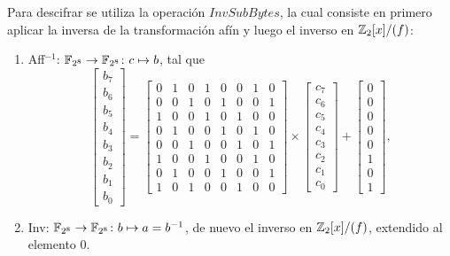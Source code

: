 \medskip
Para descifrar se utiliza la operación $InvSubBytes$, la cual consiste en primero aplicar la inversa de la transformación afín y luego el inverso en $\mathbb{Z}_2[x]/(f)$:
\vspace{-0.3em}
\begin{enumerate}[label={--}]
    \item Aff$^{-1}$: $\mathbb{F}_{2^8} \to \mathbb{F}_{2^8} \colon c \mapsto b$, tal que
    \vspace{-0.5em}
        \[
            \begin{bmatrix} 
            b_7 \\ b_6 \\ b_5 \\ b_4 \\ b_3 \\ b_2 \\ b_1 \\ b_0 
            \end{bmatrix} 
        = 
            \begin{bmatrix} 
            0 & 1 & 0 & 1 & 0 & 0 & 1 & 0 \\ 
            0 & 0 & 1 & 0 & 1 & 0 & 0 & 1 \\ 
            1 & 0 & 0 & 1 & 0 & 1 & 0 & 0 \\ 
            0 & 1 & 0 & 0 & 1 & 0 & 1 & 0 \\ 
            0 & 0 & 1 & 0 & 0 & 1 & 0 & 1 \\ 
            1 & 0 & 0 & 1 & 0 & 0 & 1 & 0 \\ 
            0 & 1 & 0 & 0 & 1 & 0 & 0 & 1 \\ 
            1 & 0 & 1 & 0 & 0 & 1 & 0 & 0 
            \end{bmatrix} 
        \times 
            \begin{bmatrix} 
            c_7 \\ c_6 \\ c_5 \\ c_4 \\ c_3 \\ c_2 \\ c_1 \\ c_0 
            \end{bmatrix} 
        + 
            \begin{bmatrix} 
            0 \\ 0 \\ 0 \\ 0 \\ 0 \\ 1 \\ 0 \\ 1 
            \end{bmatrix},
        \]
    \vspace{-0.3em}
    \item Inv: $\mathbb{F}_{2^8} \to \mathbb{F}_{2^8} \colon b \mapsto a = b^{-1}$, de nuevo el inverso en $\mathbb{Z}_2[x]/(f)$, extendido al elemento 0.
\end{enumerate}
\vspace{-1.1em}